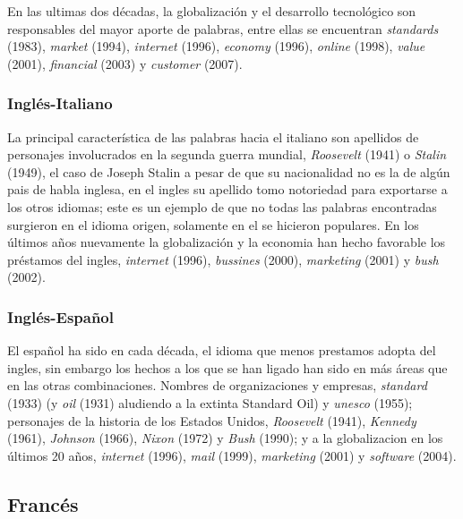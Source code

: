 En las ultimas dos décadas, la globalización y  el desarrollo tecnológico son responsables del mayor aporte de palabras, entre ellas se encuentran \textit{standards} (1983),
\textit{market} (1994), \textit{internet} (1996), \textit{economy} (1996),
\textit{online} (1998), \textit{value} (2001), \textit{financial} (2003) y
\textit{customer} (2007). 

\subsubsection*{Inglés-Italiano} %
La principal característica de las palabras hacia el italiano son apellidos de personajes involucrados en la segunda guerra mundial, \textit{Roosevelt} (1941)
o \textit{Stalin} (1949), el  caso de Joseph Stalin a pesar de que su
nacionalidad no es la de algún pais de habla inglesa, en el ingles su apellido tomo notoriedad para exportarse a los otros idiomas; este es un ejemplo de que no todas las palabras encontradas surgieron en el idioma origen,  solamente en
el se hicieron populares.  En los últimos años nuevamente la globalización y la economia  han hecho favorable los préstamos del
ingles, \textit{internet} (1996), \textit{bussines} (2000), \textit{marketing}
(2001) y \textit{bush} (2002).


\subsubsection*{Inglés-Español} 
El español ha sido en cada década,  el idioma
que menos prestamos adopta del ingles, sin embargo los hechos a los que se
han ligado han sido en más áreas que en las otras combinaciones.  Nombres de organizaciones y empresas,  \textit{standard} (1933) (y \textit{oil} (1931) aludiendo a la extinta Standard Oil) y \textit{unesco} (1955);  personajes de la historia de los Estados Unidos,  \textit{Roosevelt} (1941), \textit{Kennedy} (1961), \textit{Johnson} (1966),  \textit{Nixon} (1972) y \textit{Bush} (1990); y a la globalizacion en los últimos 20 años, \textit{internet} (1996), \textit{mail} (1999), \textit{marketing} (2001) y \textit{software} (2004).   


\subsection{Francés} %

